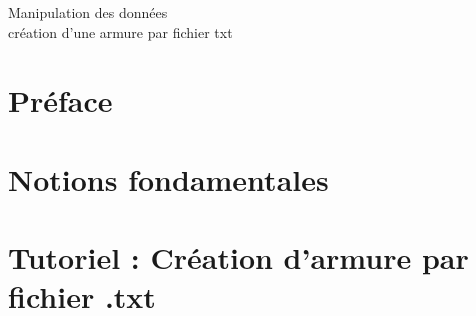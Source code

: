 \documentclass[a4paper]{report}
\begin{document}



\tableofcontents


	Manipulation des données\\
		création d'une armure par fichier txt




\chapter*{Préface}



\chapter{Notions fondamentales}



\chapter{Tutoriel : Création d'armure par fichier .txt}

\end{document}
